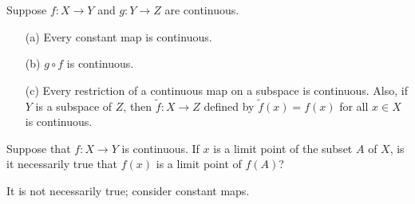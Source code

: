 \begin{prop}
    Suppose $f: X\rightarrow Y$ and $g: Y\rightarrow Z$ are continuous.
    \begin{enumerate}
        \item[(a)]
        {
            Every constant map is continuous.
        }
        \item[(b)]
        {
            $g\circ f$ is continuous.
        }
        \item[(c)]
        {
            Every restriction of a continuous map on a subspace is continuous. Also, if $Y$ is a subspace of $Z$, then $\widetilde{f}: X\rightarrow Z$ defined by $\widetilde{f}(x)=f(x)$ for all $x\in X$ is continuous.
        }
    \end{enumerate}
\end{prop}

\begin{prob}
    Suppose that $f: X\rightarrow Y$ is continuous.
    If $x$ is a limit point of the subset $A$ of $X$, is it necessarily true that $f(x)$ is a limit point of $f(A)$?
\end{prob}
\begin{sol}
    It is not necessarily true; consider constant maps.
\end{sol}

